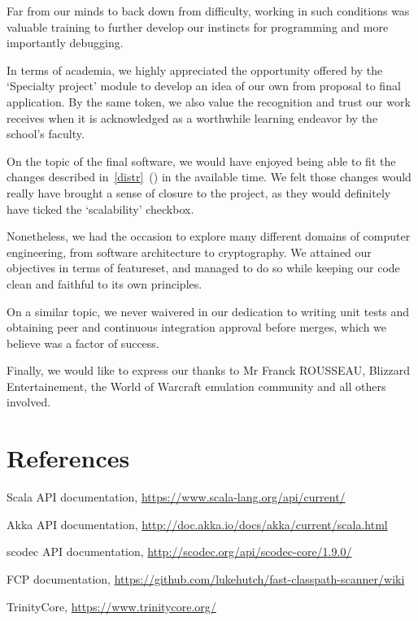 \documentclass[paper=a4, fontsize=11pt]{scrartcl}
\begin{document}
Far from our minds to back down from difficulty, working in such conditions was
valuable training to further develop our instincts for programming and
more importantly debugging. 

In terms of academia, we highly appreciated the opportunity offered by the
`Specialty project' module to develop an idea of our own from proposal
to final application.
By the same token, we also value the recognition and trust our work receives
when it is acknowledged as a worthwhile learning endeavor by the school's
faculty.

On the topic of the final software, we would have enjoyed being able to fit the
changes described in~\ref{distr}~() in the available time.
We felt those changes would really have brought a sense of closure to the
project, as they would definitely have ticked the `scalability' checkbox.

Nonetheless, we had the occasion to explore many different domains of
computer engineering, from software architecture to cryptography.  We attained
our objectives in terms of featureset, and managed to do so while keeping our
code clean and faithful to its own principles.

On a similar topic, we never waivered in our dedication to writing unit tests
and obtaining peer and continuous integration approval before merges, which
we believe was a factor of success.

Finally, we would like to express our thanks to Mr Franck ROUSSEAU, Blizzard
Entertainement, the World of Warcraft emulation community and all others
involved.

\section{References}

\begingroup{}
\renewcommand{\section}[2]{}%
\begin{thebibliography}{9}
    Scala API documentation,
    \url{https://www.scala-lang.org/api/current/}

    Akka API documentation,
    \url{http://doc.akka.io/docs/akka/current/scala.html}

    scodec API documentation,
    \url{http://scodec.org/api/scodec-core/1.9.0/}

    FCP documentation,
    \url{https://github.com/lukehutch/fast-classpath-scanner/wiki}

    TrinityCore,
    \url{https://www.trinitycore.org/}

\end{thebibliography}
\endgroup{}
\end{document}
